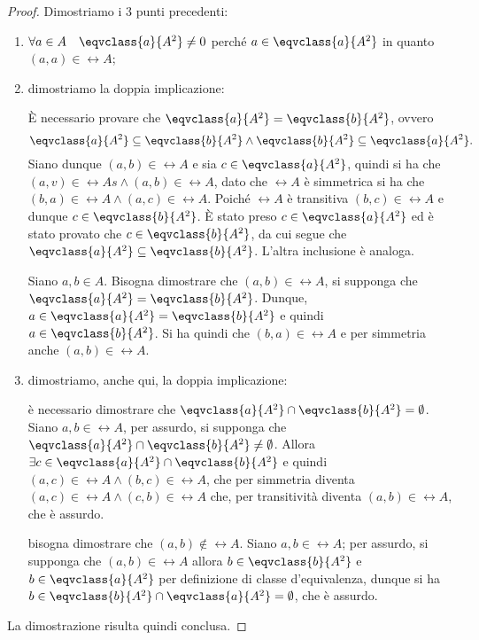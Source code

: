 \begin{proof}
    Dimostriamo i \(3\) punti precedenti:
    \begin{enumerate}
        \item \(\forall a \in A \quad \eqvclass{a}{A^2} \neq 0\) perché \(a \in \eqvclass{a}{A^2}\) in quanto \((a, a) \in \rel{A}\);
        \item dimostriamo la doppia implicazione:
            \begin{lhs}
                È necessario provare che \(\eqvclass{a}{A^2} = \eqvclass{b}{A^2}\), ovvero
                \[
                    \eqvclass{a}{A^2} \subseteq \eqvclass{b}{A^2}
                    \land
                    \eqvclass{b}{A^2} \subseteq \eqvclass{a}{A^2}.
                \]
                Siano dunque \((a, b) \in \rel{A}\) e sia \(c \in \eqvclass{a}{A^2}\), quindi si ha che \((a, v) \in \rel{As} \land (a, b) \in \rel{A}\), dato che \(\rel{A}\) è simmetrica si ha che \((b, a) \in \rel{A} \land (a, c) \in \rel{A}\). Poiché \(\rel{A}\) è transitiva \((b, c) \in \rel{A}\) e dunque \(c \in \eqvclass{b}{A^2}\).
                È stato preso \(c \in \eqvclass{a}{A^2}\) ed è stato provato che \(c \in \eqvclass{b}{A^2}\), da cui segue che \(\eqvclass{a}{A^2} \subseteq \eqvclass{b}{A^2}\). L'altra inclusione è analoga.
            \end{lhs}
            \begin{rhs}
                Siano \(a,b \in A\). Bisogna dimostrare che \((a, b) \in \rel{A}\), si supponga che \(\eqvclass{a}{A^2} = \eqvclass{b}{A^2}\). Dunque, \(a \in \eqvclass{a}{A^2} = \eqvclass{b}{A^2}\) e quindi \(a \in \eqvclass{b}{A^2}\). Si ha quindi che \((b, a) \in \rel{A}\)
                e per simmetria anche \((a, b) \in \rel{A}\).
            \end{rhs}
        \item dimostriamo, anche qui, la doppia implicazione:
            \begin{lhs}
                è necessario dimostrare che \(\eqvclass{a}{A^2} \cap \eqvclass{b}{A^2} = \emptyset\). Siano \(a,b \in \rel{A}\), per assurdo, si supponga che \(\eqvclass{a}{A^2} \cap \eqvclass{b}{A^2} \neq \emptyset\). Allora \(\exists c \in \eqvclass{a}{A^2} \cap \eqvclass{b}{A^2}\) e quindi \((a, c) \in \rel{A} \land (b, c) \in \rel{A}\), che per simmetria diventa \((a, c) \in \rel{A} \land (c, b) \in \rel{A}\) che, per transitività diventa \((a, b) \in \rel{A}\), che è assurdo.
            \end{lhs}
            \begin{rhs}
                bisogna dimostrare che \((a, b) \notin \rel{A}\). Siano \(a,b \in \rel{A}\); per assurdo, si supponga che \((a, b) \in \rel{A}\) allora \(b \in \eqvclass{b}{A^2}\) e \(b \in \eqvclass{a}{A^2}\) per definizione di classe d'equivalenza, dunque si ha \(b \in \eqvclass{b}{A^2} \cap \eqvclass{a}{A^2} = \emptyset\), che è assurdo.
            \end{rhs}
    \end{enumerate}
    La dimostrazione risulta quindi conclusa.
\end{proof}

